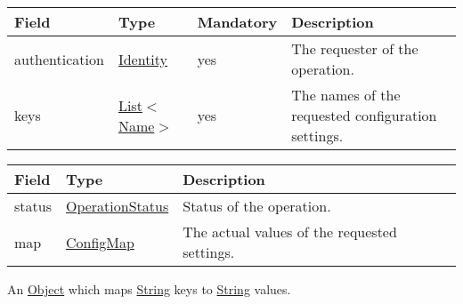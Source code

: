 \documentclass[a4paper]{arrowhead}
\newcommand{\pref}[1]{{\textcolor{ArrowheadGrey}{\hyperref[sec:model:primitives:#1]{#1}}}}
\begin{document}
 
\begin{table}[ht!]
\begin{tabularx}{\textwidth}{| p{2.5cm} | p{2.5cm} | p{2cm} | X |} \hline
\rowcolor{gray!33} Field & Type & Mandatory & Description \\ \hline
authentication & \hyperref[sec:model:Identity]{Identity} & yes & The requester of the operation. \\ \hline
keys & \pref{List}$<$\pref{Name}$>$ & yes & The names of the requested configuration settings. \\ \hline
\end{tabularx}
\end{table}


\begin{table}[ht!]
\begin{tabularx}{\textwidth}{| p{2.5cm} | p{2.5cm} | X |} \hline
\rowcolor{gray!33} Field & Type      & Description \\ \hline
status & \pref{OperationStatus} & Status of the operation. \\ \hline
map & \hyperref[sec:model:ConfigMap]{ConfigMap} & The actual values of the requested settings. \\ \hline
\end{tabularx}
\end{table}


An \pref{Object} which maps \pref{String} keys to \pref{String} values.

\clearpage

\end{document}
